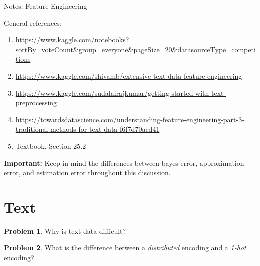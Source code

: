 \documentclass[10pt]{article}
\theoremstyle{definition}
\newtheorem{problem}{Problem}
\begin{document}
\begin{center}
\Huge
Notes: Feature Engineering
\end{center}


\noindent
General references:

\begin{enumerate}
    \item \url{https://www.kaggle.com/notebooks?sortBy=voteCount&group=everyone&pageSize=20&datasourceType=competitions}
    \item \url{https://www.kaggle.com/shivamb/extensive-text-data-feature-engineering}
    \item \url{https://www.kaggle.com/sudalairajkumar/getting-started-with-text-preprocessing}
    \item \url{https://towardsdatascience.com/understanding-feature-engineering-part-3-traditional-methods-for-text-data-f6f7d70acd41}
    \item Textbook, Section 25.2
\end{enumerate}

\noindent
\textbf{Important:}
Keep in mind the differences between bayes error, approximation error, and estimation error throughout this discussion.


\section{Text}
\begin{problem}
    Why is text data difficult?
\end{problem}

\newpage
\begin{problem}
    What is the difference between a \emph{distributed} encoding and a \emph{1-hot} encoding?
\end{problem}
\vspace{5in}
\end{document}
